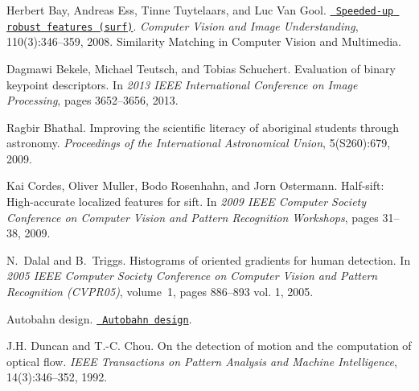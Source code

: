 
\begin{DoxyDescription}
\item[\label{citelist_CITEREF_bay2006}%
\Hypertarget{citelist_CITEREF_bay2006}%
\mbox{[}1\mbox{]}]Herbert Bay, Andreas Ess, Tinne Tuytelaars, and Luc Van Gool. \href{https://www.sciencedirect.com/science/article/pii/S1077314207001555}{\texttt{ Speeded-\/up robust features (surf)}}. {\itshape Computer Vision and Image Understanding}, 110(3)\+:346--359, 2008. Similarity Matching in Computer Vision and Multimedia. 


\item[\label{citelist_CITEREF_Bekele13}%
\Hypertarget{citelist_CITEREF_Bekele13}%
\mbox{[}2\mbox{]}]Dagmawi Bekele, Michael Teutsch, and Tobias Schuchert. Evaluation of binary keypoint descriptors. In {\itshape 2013 IEEE International Conference on Image Processing}, pages 3652--3656, 2013. 


\item[\label{citelist_CITEREF_bhathal09}%
\Hypertarget{citelist_CITEREF_bhathal09}%
\mbox{[}3\mbox{]}]Ragbir Bhathal. Improving the scientific literacy of aboriginal students through astronomy. {\itshape Proceedings of the International Astronomical Union}, 5(S260)\+:679, 2009. 


\item[\label{citelist_CITEREF_cordes09}%
\Hypertarget{citelist_CITEREF_cordes09}%
\mbox{[}4\mbox{]}]Kai Cordes, Oliver Muller, Bodo Rosenhahn, and Jorn Ostermann. Half-\/sift\+: High-\/accurate localized features for sift. In {\itshape 2009 IEEE Computer Society Conference on Computer Vision and Pattern Recognition Workshops}, pages 31--38, 2009. 


\item[\label{citelist_CITEREF_dalal05}%
\Hypertarget{citelist_CITEREF_dalal05}%
\mbox{[}5\mbox{]}]N.~Dalal and B.~Triggs. Histograms of oriented gradients for human detection. In {\itshape 2005 IEEE Computer Society Conference on Computer Vision and Pattern Recognition (CVPR\textquotesingle{}05)}, volume~1, pages 886--893 vol. 1, 2005. 


\item[\label{citelist_CITEREF_Autobahn}%
\Hypertarget{citelist_CITEREF_Autobahn}%
\mbox{[}6\mbox{]}]Autobahn design. \href{http://www.german-autobahn.eu/index.asp?page=design\#:~:text=Two\%2C\%20three\%2C\%20or\%20occasionally\%20four,lanes\%20are\%203.5\%20meters\%20wide.}{\texttt{ Autobahn design}}.


\item[\label{citelist_CITEREF_Duncan92}%
\Hypertarget{citelist_CITEREF_Duncan92}%
\mbox{[}7\mbox{]}]J.\+H. Duncan and T.-\/C. Chou. On the detection of motion and the computation of optical flow. {\itshape IEEE Transactions on Pattern Analysis and Machine Intelligence}, 14(3)\+:346--352, 1992. 



\end{DoxyDescription}
